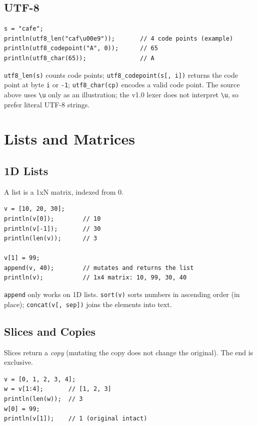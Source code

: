 \documentclass[11pt,a4paper,oneside]{report}
\newcommand{\code}[1]{\texttt{#1}}
\begin{document}
\section{UTF-8}
\begin{lstlisting}
s = "cafe";
println(utf8_len("caf\u00e9"));       // 4 code points (example)
println(utf8_codepoint("A", 0));      // 65
println(utf8_char(65));               // A
\end{lstlisting}

\code{utf8\_len(s)} counts code points; \code{utf8\_codepoint(s[, i])}
returns the code point at byte \code{i} or \code{-1};
\code{utf8\_char(cp)} encodes a valid code point. The source above uses
\code{\textbackslash u} only as an illustration; the v1.0 lexer does not
interpret \code{\textbackslash u}, so prefer literal UTF-8 strings.

\chapter{Lists and Matrices}
\label{cap:listas}

\section{1D Lists}
A list is a 1xN matrix, indexed from 0.

\begin{lstlisting}
v = [10, 20, 30];
println(v[0]);        // 10
println(v[-1]);       // 30
println(len(v));      // 3

v[1] = 99;
append(v, 40);        // mutates and returns the list
println(v);           // 1x4 matrix: 10, 99, 30, 40
\end{lstlisting}

\code{append} only works on 1D lists. \code{sort(v)} sorts numbers in
ascending order (in place); \code{concat(v[, sep])} joins the elements
into text.

\section{Slices and Copies}
Slices return a \emph{copy} (mutating the copy does not change the
original). The end is exclusive.

\begin{lstlisting}
v = [0, 1, 2, 3, 4];
w = v[1:4];       // [1, 2, 3]
println(len(w));  // 3
w[0] = 99;
println(v[1]);    // 1 (original intact)
\end{lstlisting}
\end{document}
